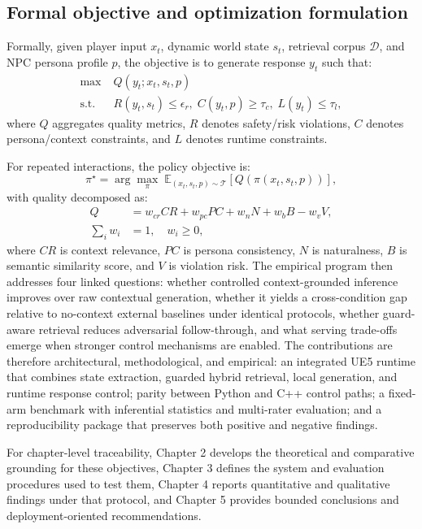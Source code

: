 ﻿\documentclass[a4paper,12pt]{article}
\begin{document}
\subsection{Formal objective and optimization formulation}
Formally, given player input \(x_t\), dynamic world state \(s_t\), retrieval corpus \(\mathcal{D}\), and NPC persona profile \(p\), the objective is to generate response \(y_t\) such that:
\begin{align}
\max\; &Q(y_t; x_t, s_t, p) \\
\text{s.t. } &R(y_t, s_t) \le \epsilon_r,\; C(y_t,p) \ge \tau_c,\; L(y_t) \le \tau_l,
\end{align}
where \(Q\) aggregates quality metrics, \(R\) denotes safety/risk violations, \(C\) denotes persona/context constraints, and \(L\) denotes runtime constraints.

For repeated interactions, the policy objective is:
\begin{equation}
\pi^\star=\arg\max_{\pi}\;\mathbb{E}_{(x_t,s_t,p)\sim\mathcal{T}}\left[Q\!\left(\pi(x_t,s_t,p)\right)\right],
\end{equation}
with quality decomposed as:
\begin{equation}
\begin{aligned}
Q &= w_{cr}CR + w_{pc}PC + w_nN + w_bB - w_vV,\\
\sum_i w_i &= 1,\quad w_i\ge0,
\end{aligned}
\end{equation}
where \(CR\) is context relevance, \(PC\) is persona consistency, \(N\) is naturalness, \(B\) is semantic similarity score, and \(V\) is violation risk. The empirical program then addresses four linked questions: whether controlled context-grounded inference improves over raw contextual generation, whether it yields a cross-condition gap relative to no-context external baselines under identical protocols, whether guard-aware retrieval reduces adversarial follow-through, and what serving trade-offs emerge when stronger control mechanisms are enabled. The contributions are therefore architectural, methodological, and empirical: an integrated UE5 runtime that combines state extraction, guarded hybrid retrieval, local generation, and runtime response control; parity between Python and C++ control paths; a fixed-arm benchmark with inferential statistics and multi-rater evaluation; and a reproducibility package that preserves both positive and negative findings.

For chapter-level traceability, Chapter 2 develops the theoretical and comparative grounding for these objectives, Chapter 3 defines the system and evaluation procedures used to test them, Chapter 4 reports quantitative and qualitative findings under that protocol, and Chapter 5 provides bounded conclusions and deployment-oriented recommendations.
\end{document}
